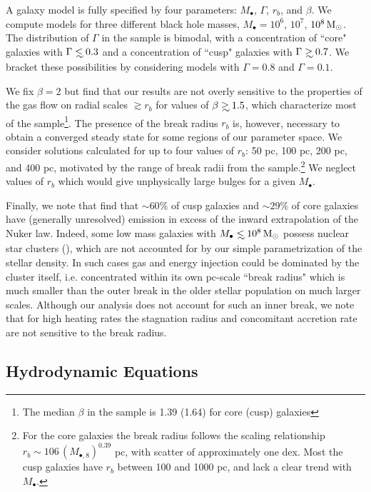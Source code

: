 \documentclass[usenatbib,fleqn]{mn2e}
\newcommand\lsim{\mathrel{\rlap{\lower4pt\hbox{\hskip1pt$\sim$}}
    \raise1pt\hbox{$<$}}}
\newcommand\gsim{\mathrel{\rlap{\lower4pt\hbox{\hskip1pt$\sim$}}
    \raise1pt\hbox{$>$}}}
\newcommand{\rb}{r_b}
\newcommand{\Mbh}[1][]{M_{\bullet#1}}
\newcommand{\Mbheight}{M_{\bullet,8}}
\begin{document}
A galaxy model is fully specified by four parameters: $\Mbh$,
$\Gamma$, $r_b$, and $\beta$.  We compute models for three different
black hole masses, $\Mbh = 10^6$, $10^7$, $10^8 \,{\rm M_\odot}$.  The
distribution of $\Gamma$ in the \citet{LauerFaber+:2007a} sample is
bimodal, with a concentration of ``core" galaxies with $\Gamma \lsim
0.3$ and a concentration of ``cusp" galaxies with $\Gamma \gsim 0.7$.
We bracket these possibilities by considering models with $\Gamma=0.8$
and $\Gamma=0.1$.  

We fix $\beta = 2$ but find that our results are not overly sensitive
to the properties of the gas flow on radial scales $\gtrsim r_b$ for
values of $\beta\gsim 1.5$, which characterize most of the
\citet{LauerFaber+:2007a} sample\footnote{The median $\beta$ in the
  \citet{LauerFaber+:2007a} sample is 1.39 (1.64) for core (cusp)
  galaxies}.  The presence of the break radius $r_{b}$ is, however,
necessary to obtain a converged steady state for some regions of our
parameter space.  We consider solutions calculated for up to four
values of $\rb$: 50 pc, 100 pc, 200 pc, and 400 pc, motivated by the
range of break radii from the \citet{LauerFaber+:2007a}
sample.\footnote{For the core galaxies the break radius follows the
  scaling relationship $\rb\sim 106 \, (\Mbheight)^{0.39}$ pc, with
  scatter of approximately one dex.  Most the cusp galaxies have $\rb$
  between 100 and 1000 pc, and lack a clear trend with $\Mbh$.}  We
neglect values of $r_b$ which would give unphysically large bulges for
a given $\Mbh$.



Finally, we note that \citealt{LauerFaber+:2005a} find that $\sim
60\%$ of cusp galaxies and $\sim29\%$ of core galaxies have (generally
unresolved) emission in excess of the inward extrapolation of the
Nuker law.  Indeed, some low mass galaxies with $\Mbh\lsim 10^{8}
\Msun$ possess nuclear star clusters (\citealt{GrahamSpitler:2009a}),
which are not accounted for by our simple parametrization of the
stellar density.  In such cases gas and energy injection could be
dominated by the cluster itself, i.e. concentrated within its own
pc-scale ``break radius" which is much smaller than the outer break in
the older stellar population on much larger scales.  Although our
analysis does not account for such an inner break, we note that for
high heating rates the stagnation radius and concomitant accretion
rate are not sensitive to the break radius.


\subsection{Hydrodynamic Equations}
\label{sec:hydro}
\end{document}
